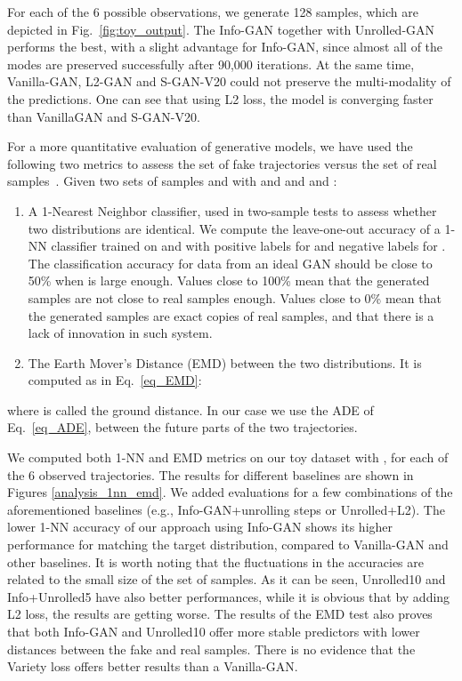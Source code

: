 \documentclass[10pt,twocolumn,letterpaper]{article}
\begin{document}
For each of the 6 possible observations, we generate 128 samples, which are depicted in Fig.~\ref{fig:toy_output}. The Info-GAN together with Unrolled-GAN performs the best, with a slight advantage for Info-GAN, since almost all of the modes are preserved successfully after 90,000 iterations. At the same time, Vanilla-GAN, L2-GAN and S-GAN-V20 could not preserve the multi-modality of the predictions. One can see that using L2 loss, the model is converging faster than VanillaGAN and S-GAN-V20.

For a more quantitative evaluation of generative models, we have used the following two metrics to assess the set of fake trajectories versus the set of real samples~\cite{ganMetrics2018Xu}. Given two sets of samples  and  with  and  and and :
\begin{enumerate}[leftmargin=*]
	\item A 1-Nearest Neighbor classifier, used in two-sample tests to assess whether two distributions are identical. We compute the leave-one-out accuracy of a 1-NN classifier trained on  and  with positive labels for  and negative labels for . The classification accuracy for data from an ideal GAN should be close to 50\% when  is large enough. Values close to 100\% mean that the generated samples are not close to real samples enough. Values close to 0\% mean that the generated samples are exact copies of real samples, and that there is a lack of innovation in such system. 

	\item  The Earth Mover's Distance (EMD) between the two distributions. It is computed as in 
	Eq.~\ref{eq_EMD}:
	{\small
	}
\end{enumerate}
where  is called the ground distance. In our case we use the ADE of Eq.~\ref{eq_ADE}, between the future parts of the two trajectories.

We computed both 1-NN and EMD metrics on our toy dataset with , for each of the 6 observed trajectories. The results for different baselines are shown in Figures \ref{analysis_1nn_emd}. We added evaluations for a few combinations of the aforementioned baselines (e.g., Info-GAN+unrolling steps or Unrolled+L2).
The lower 1-NN accuracy of our approach using Info-GAN shows its higher performance for matching the target distribution, compared to Vanilla-GAN and other baselines.  It is worth noting that the fluctuations in the accuracies are related to the small size of the set of samples. As it can be seen, Unrolled10 and Info+Unrolled5 have also better performances, while it is obvious that by adding L2 loss, the results are getting worse. The results of the EMD test also proves that both Info-GAN and Unrolled10 offer more stable predictors with lower distances between the fake and real samples. There is no evidence that the Variety loss offers better results than a Vanilla-GAN.
\end{document}
